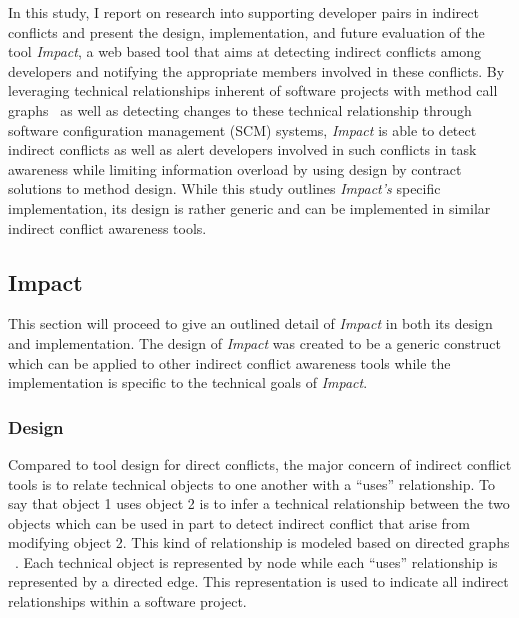 In this study, I report on research into supporting developer pairs in indirect conflicts
and present the design, implementation, and future evaluation of the tool \textit{Impact},
a web based tool that aims at detecting indirect conflicts among developers
and notifying the appropriate members involved in these conflicts.
By leveraging technical relationships inherent of 
software projects with method call graphs~\cite{Lakhotia:1993:CCM}
as well as detecting changes
to these technical relationship through software configuration management
(SCM) systems, \textit{Impact} is able to detect indirect conflicts as well as
alert developers involved in such conflicts in task awareness while limiting information
overload by using design by contract~\cite{Meyer:1988} solutions to method design. While this study
outlines \textit{Impact's} specific implementation, its design is rather
generic and can be implemented in similar indirect conflict awareness tools.

\subsection{Impact}
This section will proceed to give an outlined detail of \textit{Impact} in both its
design and implementation. The design of \textit{Impact} was created to be
a generic construct which can be applied to other indirect conflict 
awareness tools while the implementation is specific to the technical
goals of \textit{Impact}.

\subsubsection{Design}
Compared to tool design for direct conflicts, the major concern of 
indirect conflict tools is to relate technical objects to one another
with a ``uses'' relationship. To say that object 1 uses object 2 is to infer
a technical relationship between the two objects which can be used
in part to detect indirect conflict that arise from modifying object
2. This kind of relationship is modeled based on directed graphs ~\cite{Horwitz:1992:UPD}. 
Each technical object is represented by node while each ``uses''
relationship is represented by a directed edge. This representation
is used to indicate all indirect relationships within a software project.

